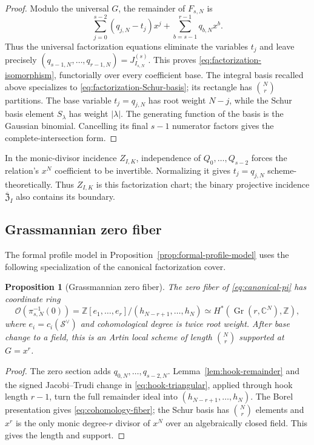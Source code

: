 \documentclass[10pt,fleqn]{article}
\numberwithin{equation}{section}
\newtheorem{proposition}[theorem]{Proposition}
\newcommand{\Gr}{\operatorname{Gr}}
\begin{document}
\begin{proof}
Modulo the universal $G$, the remainder of $F_{s,N}$ is
\begin{equation*}
 \sum_{j=0}^{s-2}(q_{j,N}-t_j)x^j+
 \sum_{b=s-1}^{r-1}q_{b,N}x^b.
\end{equation*}
Thus the universal factorization equations eliminate the variables $t_j$ and leave precisely
$(q_{s-1,N},\ldots,q_{r-1,N})=J_{I_{s,N}}^{(s)}$.  This proves
\eqref{eq:factorization-isomorphism}, functorially over every coefficient base.
The integral basis recalled above specializes to
\eqref{eq:factorization-Schur-basis}; its rectangle has $\binom Nr$ partitions.
The base variable $t_j=q_{j,N}$ has root weight $N-j$, while the Schur basis element
$S_\lambda$ has weight $|\lambda|$.  The generating function of the basis is the Gaussian
binomial.  Cancelling its final $s-1$ numerator factors gives the complete-intersection form.
\end{proof}

In the monic-divisor incidence $Z_{I,K}$, independence of
$Q_0,\ldots,Q_{s-2}$ forces the relation's $x^N$ coefficient to be
invertible.  Normalizing it gives $t_j=q_{j,N}$ scheme-theoretically.
Thus $Z_{I,K}$ is this factorization chart; the binary projective
incidence $\overline{\mathfrak Z}_I$ also contains its boundary.

\subsection{Grassmannian zero fiber}

The formal profile model in Proposition~\ref{prop:formal-profile-model} uses the
following specialization of the canonical factorization cover.

\begin{proposition}[Grassmannian zero fiber]\label{prop:grassmannian-zero-fiber}
The zero fiber of \eqref{eq:canonical-pi} has coordinate ring
\begin{equation}\label{eq:cohomology-fiber}
 \mathcal O(\pi_{s,N}^{-1}(0))
 =\mathbb Z[e_1,\ldots,e_r]/(h_{N-r+1},\ldots,h_N)
 \simeq H^*(\Gr(r,\mathbb C^N),\mathbb Z),
\end{equation}
where $e_i=c_i(\mathcal S^\vee)$ and cohomological degree is twice root
weight.  After base change to a field, this is an Artin local scheme of length
$\binom Nr$ supported at $G=x^r$.
\end{proposition}

\begin{proof}
The zero section adds $q_{0,N},\ldots,q_{s-2,N}$.  Lemma~\ref{lem:hook-remainder}
and the signed Jacobi--Trudi change in \eqref{eq:hook-triangular}, applied
through hook length $r-1$, turn the full remainder ideal into
$(h_{N-r+1},\ldots,h_N)$.  The Borel presentation gives
\eqref{eq:cohomology-fiber}; the Schur basis has $\binom Nr$ elements and
$x^r$ is the only monic degree-$r$ divisor of $x^N$ over an algebraically
closed field.  This gives the length and support.
\end{proof}
\end{document}
